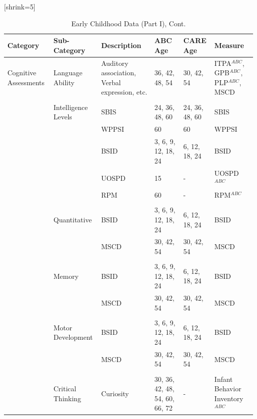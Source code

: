 \documentclass[static]{JJH-Beamer}
\begin{document}
\begin{frame}
 \addtocounter{framenumber}{-1}[shrink=5]

\begin{table}[H]
\addtocounter{table}{-1}
\caption{Early Childhood Data (Part I), Cont.}
\begin{center}
\begin{tiny}
\begin{tabular}{L{1.4cm} C{2cm} C{1.5cm} C{1.3cm} C{1.3cm}  C{2cm}}
\toprule
\textbf{Category}	&	\textbf{Sub-Category}	&	\textbf{Description}	&	\textbf{ABC Age}  	&  \textbf{CARE Age}  & 	\textbf{Measure}	\\ \midrule
Cognitive Assessments	&	Language Ability	&	Auditory association, Verbal expression, etc. 	&	36, 42, 48, 54	&	30, 42, 54	&	ITPA$^{ABC}$, GPB$^{ABC}$, PLP$^{ABC}$, MSCD \\
	&	\\
	&	Intelligence Levels	&	SBIS 	&	24, 36, 48, 60	&	24, 36, 48, 60	&	SBIS	\\
	&		&	WPPSI	&	60	&	60	&	WPPSI	\\
	&		&	BSID 	&	3, 6, 9, 12, 18, 24	&	6, 12, 18, 24		&	BSID	\\
	&		&	UOSPD	&	15	&	- 	&	UOSPD$^{ABC}$	\\
	&		&	RPM	&	60	&	-	&	RPM$^{ABC}$	\\
	&	\\
	&	Quantitative	 &	BSID 	&	3, 6, 9, 12, 18, 24	&	6, 12, 18, 24		&	BSID	\\
	&		&	MSCD 	&	30, 42, 54		&	30, 42, 54	&	MSCD	\\
	&	\\
	&	Memory	&	BSID 	&	3, 6, 9, 12, 18, 24	& 	6, 12, 18, 24		&	BSID	\\
	&		&	MSCD 	&	30, 42, 54	&	30, 42, 54	&	MSCD	\\
	&	\\
	&	Motor Development	&	BSID 	&	3, 6, 9, 12, 18, 24	&	6, 12, 18, 24		&	BSID\\
	&		&	MSCD 	&	30, 42, 54	&	30, 42, 54	&	MSCD	\\
	& 	\\
	&	Critical Thinking	&	Curiosity	&	30, 36, 42, 48, 54, 60, 66, 72	& - &	Infant Behavior Inventory$^{ABC}$	\\
\bottomrule
\end{tabular}
\end{tiny}
\end{center}
\end{table}

\end{frame}
\end{document}
